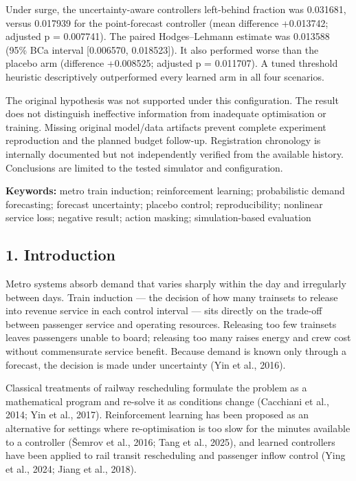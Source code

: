 \documentclass[
]{article}
\begin{document}
Under surge, the uncertainty-aware controller\textquotesingle s
left-behind fraction was 0.031681, versus 0.017939 for the
point-forecast controller (mean difference +0.013742; adjusted p =
0.007741). The paired Hodges--Lehmann estimate was 0.013588 (95\% BCa
interval {[}0.006570, 0.018523{]}). It also performed worse than the
placebo arm (difference +0.008525; adjusted p = 0.011707). A tuned
threshold heuristic descriptively outperformed every learned arm in all
four scenarios.

The original hypothesis was not supported under this configuration. The
result does not distinguish ineffective information from inadequate
optimisation or training. Missing original model/data artifacts prevent
complete experiment reproduction and the planned budget follow-up.
Registration chronology is internally documented but not independently
verified from the available history. Conclusions are limited to the
tested simulator and configuration.

\textbf{Keywords:} metro train induction; reinforcement learning;
probabilistic demand forecasting; forecast uncertainty; placebo control;
reproducibility; nonlinear service loss; negative result; action
masking; simulation-based evaluation

\subsection{1. Introduction}\label{1-introduction}

Metro systems absorb demand that varies sharply within the day and
irregularly between days. Train induction --- the decision of how many
trainsets to release into revenue service in each control interval ---
sits directly on the trade-off between passenger service and operating
resources. Releasing too few trainsets leaves passengers unable to
board; releasing too many raises energy and crew cost without
commensurate service benefit. Because demand is known only through a
forecast, the decision is made under uncertainty (Yin et al., 2016).

Classical treatments of railway rescheduling formulate the problem as a
mathematical program and re-solve it as conditions change (Cacchiani et
al., 2014; Yin et al., 2017). Reinforcement learning has been proposed
as an alternative for settings where re-optimisation is too slow for the
minutes available to a controller (Šemrov et al., 2016; Tang et al.,
2025), and learned controllers have been applied to rail transit
rescheduling and passenger inflow control (Ying et al., 2024; Jiang et
al., 2018).
\end{document}
